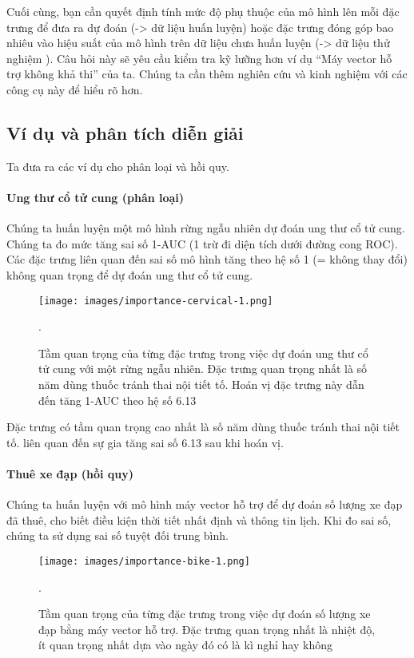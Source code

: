Cuối cùng, bạn cần quyết định tính mức độ phụ thuộc của mô hình lên mỗi đặc trưng để đưa ra dự đoán (-> dữ liệu huấn luyện) hoặc đặc trưng đóng góp bao nhiêu vào hiệu suất của mô hình trên dữ liệu chưa huấn luyện (-> dữ liệu thử nghiệm ). Câu hỏi này sẽ yêu cầu kiểm tra kỹ lưỡng hơn ví dụ ``Máy vector hỗ trợ không khả thi'' của ta. Chúng ta cần thêm nghiên cứu và kinh nghiệm với các công cụ này để hiểu rõ hơn.

\subsection{Ví dụ và phân tích diễn giải}
Ta đưa ra các ví dụ cho phân loại và hồi quy.

\paragraph{Ung thư cổ tử cung (phân loại)}
Chúng ta huấn luyện một mô hình rừng ngẫu nhiên dự đoán ung thư cổ tử cung. Chúng ta đo mức tăng sai số 1-AUC (1 trừ đi diện tích dưới đường cong ROC). Các đặc trưng liên quan đến sai số mô hình tăng theo hệ số 1 (= không thay đổi) không quan trọng để dự đoán ung thư cổ tử cung.

\begin{figure*}[h!]
	\centering
	\texttt{[image: images/importance-cervical-1.png]}
	\label{fig:5_29}
	\caption{Tầm quan trọng của từng đặc trưng trong việc dự đoán ung thư cổ tử cung với một rừng ngẫu nhiên. Đặc trưng quan trọng nhất là số năm dùng thuốc tránh thai nội tiết tố. Hoán vị đặc trưng này dẫn đến tăng 1-AUC theo hệ số 6.13}.
	
\end{figure*}

Đặc trưng có tầm quan trọng cao nhất là số năm dùng thuốc tránh thai nội tiết tố. liên quan đến sự gia tăng sai số 6.13 sau khi hoán vị.

\paragraph{Thuê xe đạp (hồi quy)}
Chúng ta huấn luyện với mô hình máy vector hỗ trợ để dự đoán số lượng xe đạp đã thuê, cho biết điều kiện thời tiết nhất định và thông tin lịch. Khi đo sai số, chúng ta sử dụng sai số tuyệt đối trung bình.

\begin{figure*}[h!]
	\centering
	\texttt{[image: images/importance-bike-1.png]}
	\label{fig:5_30}
	\caption{Tầm quan trọng của từng đặc trưng trong việc dự đoán số lượng xe đạp bằng máy vector hỗ trợ. Đặc trưng quan trọng nhất là nhiệt độ, ít quan trọng nhất dựa vào ngày đó có là kì nghỉ hay không}.
	
\end{figure*}

